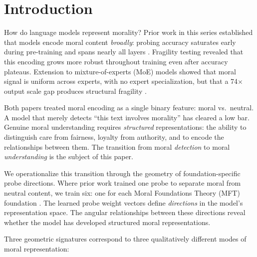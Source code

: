 \section{Introduction}\label{introduction}

How do language models represent morality? Prior work in this
series established that models encode moral content \emph{broadly}:
probing accuracy saturates early during pre-training and spans
nearly all layers \citep{reblitzrichardson2026fragility}. Fragility
testing revealed that this encoding grows more robust throughout
training even after accuracy plateaus. Extension to
mixture-of-experts (MoE) models showed that moral signal is
uniform across experts, with no expert specialization, but that a
74\(\times\) output scale gap produces structural fragility
\citep{reblitzrichardson2026dilution}.

Both papers treated moral encoding as a single binary feature:
moral vs.~neutral. A model that merely detects ``this text involves
morality'' has cleared a low bar. Genuine moral understanding
requires \emph{structured} representations: the ability to distinguish
care from fairness, loyalty from authority, and to encode the
relationships between them. The transition from moral \emph{detection}
to moral \emph{understanding} is the subject of this paper.

We operationalize this transition through the geometry of
foundation-specific probe directions. Where prior work trained one
probe to separate moral from neutral content, we train six: one for
each Moral Foundations Theory (MFT) foundation
\citep{haidt2012righteous, graham2013mft}. The learned probe weight
vectors define \emph{directions} in the model's representation space.
The angular relationships between these directions reveal whether
the model has developed structured moral representations.

Three geometric signatures correspond to three qualitatively
different modes of moral representation:

